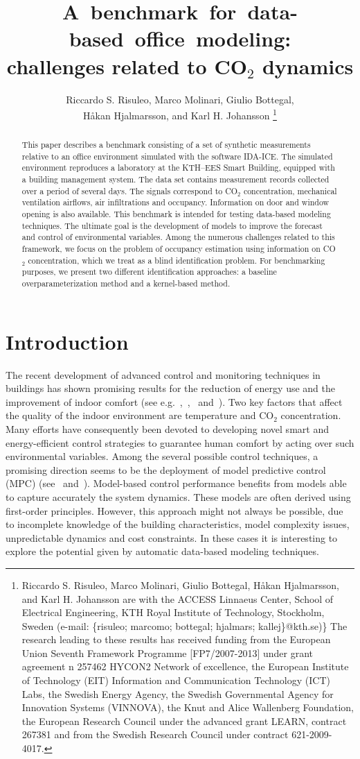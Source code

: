 \documentclass{article}
\title{A~benchmark~for~data-based~office~modeling:\\ challenges related to CO$_2$ dynamics}
\author{Riccardo S. Risuleo, Marco Molinari, Giulio Bottegal,\\ H\r{a}kan
 Hjalmarsson, and Karl H. Johansson
\thanks{Riccardo S. Risuleo, Marco Molinari, Giulio Bottegal, H\r{a}kan
  Hjalmarsson, and Karl H. Johansson are with the ACCESS Linnaeus Center, School
  of Electrical Engineering, KTH Royal Institute of Technology, Stockholm,
Sweden (e-mail: \{risuleo; marcomo; bottegal; hjalmars; kallej\}@kth.se)\}
  The research leading to these results has received funding from the European
  Union Seventh Framework Programme [FP7/2007-2013] under grant agreement n\textdegree{} 257462 HYCON2 Network of excellence, the
  European Institute of Technology (EIT) Information and Communication
  Technology (ICT) Labs, the Swedish Energy Agency, the Swedish Governmental
  Agency for Innovation Systems (VINNOVA), the Knut and Alice Wallenberg
  Foundation, the European Research Council under the advanced grant LEARN,
  contract 267381 and from the Swedish Research Council under contract
  621-2009-4017.}}
\begin{document}
\maketitle

\begin{abstract}
This paper describes a benchmark consisting of a set of synthetic measurements
relative to an office environment simulated with the software \textsc{IDA-ICE}.
The simulated environment reproduces a laboratory at the KTH--EES Smart Building, equipped with a building management system.  The data set contains
measurement records collected over a period of several days. The signals
correspond to CO$_2$ concentration, mechanical ventilation
airflows, air infiltrations and occupancy. Information on door and window opening
is also available.  This benchmark is intended for testing data-based modeling
techniques. The ultimate goal is the development of models to improve the forecast
and control of environmental variables.  Among the numerous challenges related
to this framework, we focus on the problem of occupancy estimation using
information on CO$_2$ concentration, which we treat as a blind identification
problem. For benchmarking purposes, we present two different identification
approaches: a baseline overparameterization method and a kernel-based method.
\end{abstract}



\section{Introduction}
The recent development of advanced control and monitoring techniques in
buildings has shown promising results for the reduction of energy use and the
improvement of indoor comfort (see
e.g.~\cite{vana2014model},~\cite{siroky2011experimental},~\cite{ferreira2012neural}
and~\cite{costa2013building}). Two key factors that
affect the quality of the indoor environment are temperature and CO$_2$
concentration. Many efforts have consequently been devoted to developing novel smart
and energy-efficient control strategies to guarantee human comfort by acting
over such environmental variables. Among the several possible control
techniques, a promising direction seems to be the deployment of model predictive
control (MPC) (see~\cite{oldewurtel2012use} and~\cite{parisio2014implementation}).
Model-based control performance benefits from models able to capture
accurately the system dynamics. These models are often derived using first-order
principles. However, this approach might not always be possible, due
to incomplete knowledge of the building characteristics, model complexity
issues, unpredictable dynamics and cost constraints. In these cases it
is interesting to explore the potential given by automatic data-based
modeling techniques.
\end{document}

